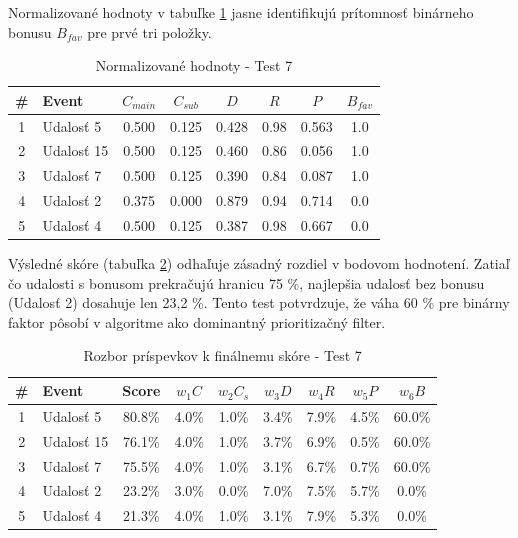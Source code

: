 \documentclass[12pt,a4paper]{article}
\begin{document}
Normalizované hodnoty v tabuľke \ref{tab:norm_test7} jasne identifikujú prítomnosť binárneho bonusu $B_{fav}$ pre prvé tri položky.

\begin{table}[H]
\centering
\small
\begin{tabular}{|c|l|c|c|c|c|c|c|}
\hline
\textbf{\#} & \textbf{Event} & $C_{main}$ & $C_{sub}$ & $D$ & $R$ & $P$ & $B_{fav}$ \\
\hline
1 & Udalosť 5  & 0.500 & 0.125 & 0.428 & 0.98 & 0.563 & 1.0 \\
2 & Udalosť 15 & 0.500 & 0.125 & 0.460 & 0.86 & 0.056 & 1.0 \\
3 & Udalosť 7  & 0.500 & 0.125 & 0.390 & 0.84 & 0.087 & 1.0 \\
4 & Udalosť 2  & 0.375 & 0.000 & 0.879 & 0.94 & 0.714 & 0.0 \\
5 & Udalosť 4  & 0.500 & 0.125 & 0.387 & 0.98 & 0.667 & 0.0 \\
\hline
\end{tabular}
\caption{Normalizované hodnoty - Test 7}
\label{tab:norm_test7}
\end{table}

Výsledné skóre (tabuľka \ref{tab:vysledky_test7}) odhaľuje zásadný rozdiel v bodovom hodnotení. Zatiaľ čo udalosti s bonusom prekračujú hranicu 75 \%, najlepšia udalosť bez bonusu (Udalosť 2) dosahuje len 23,2 \%. Tento test potvrdzuje, že váha 60 \% pre binárny faktor pôsobí v algoritme ako dominantný prioritizačný filter.

\begin{table}[H]
\centering
\small
\begin{tabular}{|c|l|c|c|c|c|c|c|c|}
\hline
\textbf{\#} & \textbf{Event} & \textbf{Score} & $w_1 C$ & $w_2 C_s$ & $w_3 D$ & $w_4 R$ & $w_5 P$ & $w_6 B$ \\
\hline
1 & Udalosť 5  & 80.8\% & 4.0\% & 1.0\% & 3.4\% & 7.9\% & 4.5\% & 60.0\% \\
2 & Udalosť 15 & 76.1\% & 4.0\% & 1.0\% & 3.7\% & 6.9\% & 0.5\% & 60.0\% \\
3 & Udalosť 7  & 75.5\% & 4.0\% & 1.0\% & 3.1\% & 6.7\% & 0.7\% & 60.0\% \\
4 & Udalosť 2  & 23.2\% & 3.0\% & 0.0\% & 7.0\% & 7.5\% & 5.7\% & 0.0\% \\
5 & Udalosť 4  & 21.3\% & 4.0\% & 1.0\% & 3.1\% & 7.9\% & 5.3\% & 0.0\% \\
\hline
\end{tabular}
\caption{Rozbor príspevkov k finálnemu skóre - Test 7}
\label{tab:vysledky_test7}
\end{table}
\end{document}

